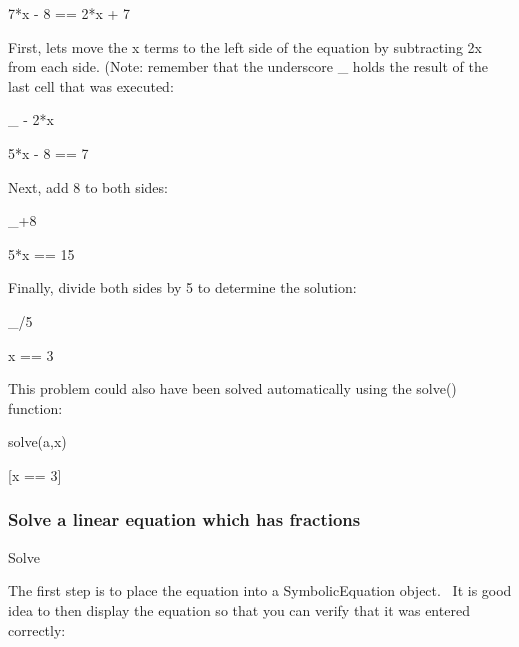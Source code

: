 \documentclass[12pt,twoside]{book}
\begin{document}
{\textbar}

7*x {}- 8 == 2*x + 7

{\textquotedbl}{\textquotedbl}{\textquotedbl}

First, lets move the x terms to the left side of the equation by
subtracting 2x from each side. (Note: remember that the underscore
{\textquotesingle}\_{\textquotesingle} holds the result of the last
cell that was executed:

{\textquotedbl}{\textquotedbl}{\textquotedbl}

\_ {}- 2*x

{\textbar}

5*x {}- 8 == 7

{\textquotedbl}{\textquotedbl}{\textquotedbl}

Next, add 8 to both sides:

{\textquotedbl}{\textquotedbl}{\textquotedbl}

\_+8

{\textbar}

5*x == 15

{\textquotedbl}{\textquotedbl}{\textquotedbl}

Finally, divide both sides by 5 to determine the solution:

{\textquotedbl}{\textquotedbl}{\textquotedbl}

\_/5

{\textbar}

x == 3

{\textquotedbl}{\textquotedbl}{\textquotedbl}

This problem could also have been solved automatically using the solve()
function:

{\textquotedbl}{\textquotedbl}{\textquotedbl}

solve(a,x)

{\textbar}

[x == 3]

\subsubsection[Solve a linear equation which has
fractions]{Solve a linear equation which has fractions}
Solve 


\bigskip

{\textquotedbl}{\textquotedbl}{\textquotedbl}

The first step is to place the equation into a SymbolicEquation object.
\ It is good idea to then display the equation so that you can verify
that it was entered correctly:
\end{document}
